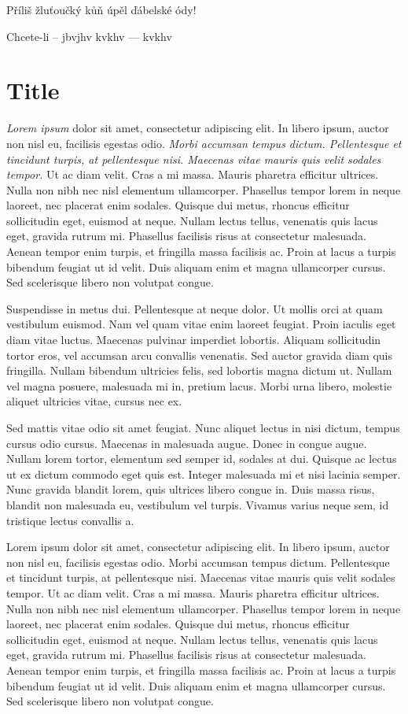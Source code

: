 \documentclass{report}
\begin{document}
	
	Příliš žluťoučký kůň úpěl ďábelské ódy!
	
	Chcete-li -- jbvjhv kvkhv --- kvkhv
	
	\section*{Title}
	
	\emph{Lorem ipsum} dolor sit amet, consectetur adipiscing elit. In libero ipsum, auctor non nisl eu, facilisis egestas odio. \textit{Morbi accumsan tempus dictum. Pellentesque et tincidunt turpis, at pellentesque nisi. Maecenas vitae mauris quis velit sodales tempor.} Ut ac diam velit. Cras a mi massa. Mauris pharetra efficitur ultrices. Nulla non nibh nec nisl elementum ullamcorper. Phasellus tempor lorem in neque laoreet, nec placerat enim sodales. Quisque dui metus, rhoncus efficitur sollicitudin eget, euismod at neque. Nullam lectus tellus, venenatis quis lacus eget, gravida rutrum mi. Phasellus facilisis risus at consectetur malesuada. Aenean tempor enim turpis, et fringilla massa facilisis ac. Proin at lacus a turpis bibendum feugiat ut id velit. Duis aliquam enim et magna ullamcorper cursus. Sed scelerisque libero non volutpat congue.
	
	Suspendisse in metus dui. Pellentesque at neque dolor. Ut mollis orci at quam vestibulum euismod. Nam vel quam vitae enim laoreet feugiat. Proin iaculis eget diam vitae luctus. Maecenas pulvinar imperdiet lobortis. Aliquam sollicitudin tortor eros, vel accumsan arcu convallis venenatis. Sed auctor gravida diam quis fringilla. Nullam bibendum ultricies felis, sed lobortis magna dictum ut. Nullam vel magna posuere, malesuada mi in, pretium lacus. Morbi urna libero, molestie aliquet ultricies vitae, cursus nec ex.
	
	\newpage
	
	Sed mattis vitae odio sit amet feugiat. Nunc aliquet lectus in nisi dictum, tempus cursus odio cursus. Maecenas in malesuada augue. Donec in congue augue. Nullam lorem tortor, elementum sed semper id, sodales at dui. Quisque ac lectus ut ex dictum commodo eget quis est. Integer malesuada mi et nisi lacinia semper. Nunc gravida blandit lorem, quis ultrices libero congue in. Duis massa risus, blandit non malesuada eu, vestibulum vel turpis. Vivamus varius neque sem, id tristique lectus convallis a.
	
	Lorem ipsum dolor sit amet, consectetur adipiscing elit. In libero ipsum, auctor non nisl eu, facilisis egestas odio. Morbi accumsan tempus dictum. Pellentesque et tincidunt turpis, at pellentesque nisi. Maecenas vitae mauris quis velit sodales tempor. Ut ac diam velit. Cras a mi massa. Mauris pharetra efficitur ultrices. Nulla non nibh nec nisl elementum ullamcorper. Phasellus tempor lorem in neque laoreet, nec placerat enim sodales. Quisque dui metus, rhoncus efficitur sollicitudin eget, euismod at neque. Nullam lectus tellus, venenatis quis lacus eget, gravida rutrum mi. Phasellus facilisis risus at consectetur malesuada. Aenean tempor enim turpis, et fringilla massa facilisis ac. Proin at lacus a turpis bibendum feugiat ut id velit. Duis aliquam enim et magna ullamcorper cursus. Sed scelerisque libero non volutpat congue.
	
\end{document}
